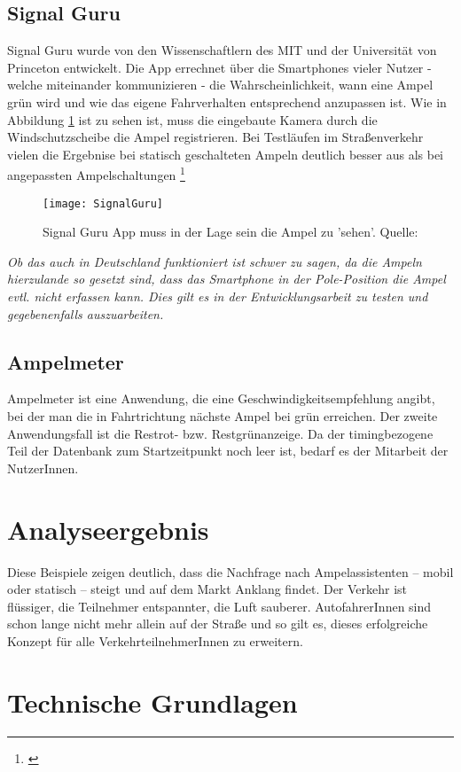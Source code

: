 \subsection{Signal Guru}
Signal Guru wurde von den Wissenschaftlern des \gls{MIT} und der Universität von Princeton entwickelt. Die App errechnet über die Smartphones vieler Nutzer - welche miteinander kommunizieren -  die Wahrscheinlichkeit, wann eine Ampel grün wird und wie das eigene Fahrverhalten entsprechend anzupassen ist. Wie in Abbildung \ref{fig:AppSignalGuru} ist zu sehen ist, muss die eingebaute Kamera durch die Windschutzscheibe die Ampel registrieren. Bei Testläufen im Straßenverkehr vielen die Ergebnise bei statisch geschalteten Ampeln deutlich besser aus als bei angepassten Ampelschaltungen \footnote{\cite{SignalGuru}} 
\begin{figure}[H]
    \centering
    \texttt{[image: SignalGuru]}
    \caption[Signal Guru]{Signal Guru App muss in der Lage sein die Ampel zu 'sehen'.  Quelle: \cite{SignalGuruPaper}}
    \label{fig:AppSignalGuru}
\end{figure}
\textit{Ob das auch in Deutschland funktioniert ist schwer zu sagen, da die Ampeln hierzulande so gesetzt sind, dass das Smartphone in der Pole-Position die Ampel evtl. nicht erfassen kann. Dies gilt es in der Entwicklungsarbeit zu testen und gegebenenfalls auszuarbeiten.}
\subsection{Ampelmeter}
Ampelmeter ist eine Anwendung, die eine Geschwindigkeitsempfehlung angibt, bei der man die in Fahrtrichtung nächste Ampel bei grün erreichen. Der zweite Anwendungsfall ist die Restrot- bzw. Restgrünanzeige. Da der timingbezogene Teil der Datenbank zum Startzeitpunkt noch leer ist, bedarf es der Mitarbeit der NutzerInnen.
\section{Analyseergebnis}
Diese Beispiele zeigen deutlich, dass die Nachfrage nach Ampelassistenten -- mobil oder statisch -- steigt und auf dem Markt Anklang findet. Der Verkehr ist flüssiger, die Teilnehmer entspannter, die Luft sauberer. AutofahrerInnen sind schon lange nicht mehr allein auf der Straße und so gilt es, dieses erfolgreiche Konzept für alle VerkehrteilnehmerInnen zu erweitern.
%
%
%
%
\section{Technische Grundlagen}
